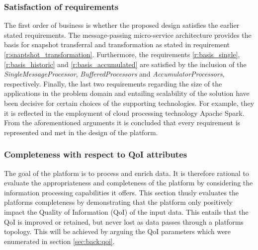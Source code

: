 \subsubsection*{Satisfaction of requirements}
The first order of business is whether the proposed design satisfies the earlier stated requirements. The message-passing micro-service architecture provides the basis for snapshot transferral and transformation as stated in requirement \ref{r:snaptshot_transformation}. Furthermore, the requirements \ref{r:basis_single}, \ref{r:basis_historic} and \ref{r:basis_accumulated} are satisfied by the inclusion of the \emph{SingleMessageProcessor}, \emph{BufferedProcessors} and \emph{AccumulatorProcessors}, respectively. Finally, the last two requirements regarding the size of the applications in the problem domain and entailing scalability of the solution have been decisive for certain choices of the supporting technologies. For example, they it is reflected in the employment of cloud processing technology Apache Spark. From the aforementioned arguments it is concluded that every requirement is represented and met in the design of the platform.

\subsubsection*{Completeness with respect to QoI attributes}
The goal of the platform is to process and enrich data. It is therefore rational to evaluate the appropriateness and completeness of the platform by considering the information processing capabilities it offers. This section thusly evaluates the platforms completeness by demonstrating that the platform only positively impact the Quality of Information (QoI) of the input data. This entails that the QoI is improved or retained, but never lost as data passes through a platforms topology. This will be achieved by arguing the QoI parameters which were enumerated in section \ref{sec:back:qoi}. 

